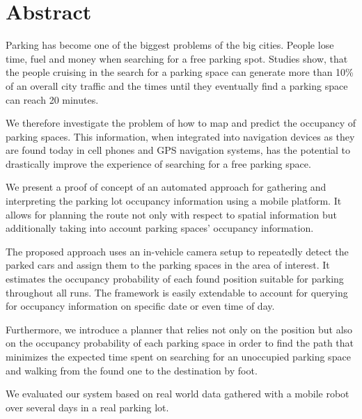 \chapter*{Abstract}
\label{cha:abstract}

Parking has become one of the biggest problems of the big cities. People lose
time, fuel and money when searching for a free parking spot. Studies show,
that the people cruising in the search for a parking space can generate more
than 10\% of an overall city traffic and the times until they eventually find
a parking space can reach 20 minutes.

We therefore investigate the problem of how to map and predict the occupancy
of parking spaces. This information, when integrated into navigation devices
as they are found today in cell phones and GPS navigation systems, has the
potential to drastically improve the experience of searching for a free
parking space.

We present a proof of concept of an automated approach for gathering and
interpreting the parking lot occupancy information using a mobile platform. It
allows for planning the route not only with respect to spatial information but
additionally taking into account parking spaces' occupancy information.

The proposed approach uses an in-vehicle camera setup to repeatedly detect the
parked cars and assign them to the parking spaces in the area of interest. It
estimates the occupancy probability of each found position suitable for
parking throughout all runs. The framework is easily extendable to account for
querying for occupancy information on specific date or even time of day.

Furthermore, we introduce a planner that relies not only on the position but
also on the occupancy probability of each parking space in order to find the
path that minimizes the expected time spent on searching for an unoccupied
parking space and walking from the found one to the destination by foot.

We evaluated our system based on real world data gathered with a mobile robot
over several days in a real parking lot.



